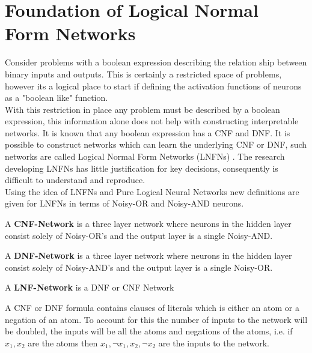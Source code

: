\chapter{Foundation of Logical Normal Form Networks}\label{C:foundation-of-lnfns}
Consider problems with a boolean expression describing the relation ship between binary inputs and outputs. This is certainly a restricted space of problems, however its a logical place to start if defining the activation functions of neurons as a "boolean like" function.\\

With this restriction in place any problem must be described by a boolean expression, this information alone does not help with constructing interpretable networks. It is known that any boolean expression has a CNF and DNF. It is possible to construct networks which can learn the underlying CNF or DNF, such networks are called Logical Normal Form Networks (LNFNs) \cite{herrmann1996backpropagation}. The research developing LNFNs has little justification for key decisions, consequently is difficult to understand and reproduce.\\

Using the idea of LNFNs \cite{herrmann1996backpropagation} and Pure Logical Neural Networks \cite{LearningLogicalActivations} new definitions are given for LNFNs in terms of Noisy-OR and Noisy-AND neurons.

\theoremstyle{definition}
\begin{definition}
A \textbf{CNF-Network} is a three layer network where neurons in the hidden layer consist solely of Noisy-OR's and the output layer is a single Noisy-AND. 
\end{definition}

\theoremstyle{definition}
\begin{definition}
A \textbf{DNF-Network} is a three layer network where neurons in the hidden layer consist solely of Noisy-AND's and the output layer is a single Noisy-OR. 
\end{definition}

\theoremstyle{definition}
\begin{definition}
A \textbf{LNF-Network} is a DNF or CNF Network
\end{definition}

A CNF or DNF formula contains clauses of literals which is either an atom or a negation of an atom. To account for this the number of inputs to the network will be doubled, the inputs will be all the atoms and negations of the atoms, i.e. if $x_1, x_2$ are the atoms then $x_1, \lnot x_1, x_2, \lnot x_2$ are the inputs to the network.\\ 

